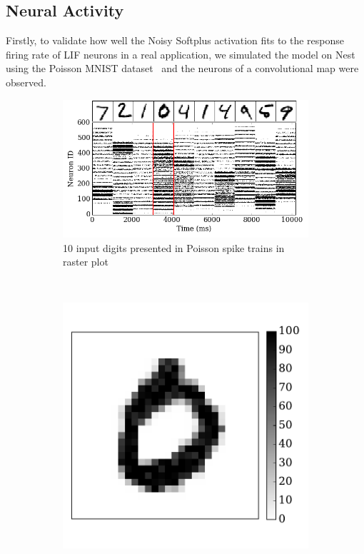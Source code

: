 	
	\subsection{Neural Activity}
	Firstly, to validate how well the Noisy Softplus activation fits to the response firing rate of LIF neurons in a real application, we simulated the model on Nest using the Poisson MNIST dataset~\cite{liu2016bench} and the neurons of a convolutional map were observed.
	
		\begin{figure}[tbh!]
		\centering
		\begin{subfigure}[t]{0.8\textwidth}
			\includegraphics[width=\textwidth]{pics_iconip/6-1.png}
			\caption{10 input digits presented in Poisson spike trains in raster plot}
			\label{Fig:61}
		\end{subfigure}\\
		\begin{subfigure}[t]{0.3\textwidth}
			\includegraphics[width=\textwidth]{pics_iconip/6-2.pdf}

\end{subfigure}
\end{figure}
